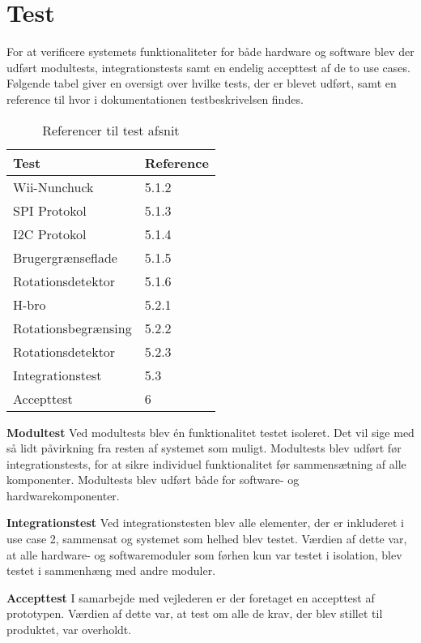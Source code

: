\chapter{Test}
For at verificere systemets funktionaliteter for både hardware og software blev der udført modultests, integrationstests samt en endelig accepttest af de to use cases. Følgende tabel giver en oversigt over hvilke tests, der er blevet udført, samt en reference til hvor i dokumentationen testbeskrivelsen findes.

\begin{table}[H]
	\centering
	\label{test}
	\begin{tabular}{|l|l|}
		\hline
		\textbf{Test}      & \textbf{Reference} \\ \hline
		Wii-Nunchuck        & 5.1.2              \\ \hline
		SPI Protokol        & 5.1.3              \\ \hline
		I2C Protokol        & 5.1.4              \\ \hline
		Brugergrænseflade   & 5.1.5              \\ \hline
		Rotationsdetektor   & 5.1.6              \\ \hline
		H-bro               & 5.2.1              \\ \hline
		Rotationsbegrænsing & 5.2.2              \\ \hline
		Rotationsdetektor   & 5.2.3              \\ \hline
		Integrationstest    & 5.3                \\ \hline
		Accepttest          & 6                  \\ \hline
		
	\end{tabular}
	\caption{Referencer til test afsnit}
\end{table}

\noindent \textbf{Modultest} \newline
\noindent Ved modultests blev én funktionalitet testet isoleret. Det vil sige med så lidt påvirkning fra resten af systemet som muligt. Modultests blev udført før integrationstests, for at sikre individuel funktionalitet før sammensætning af alle komponenter. Modultests blev udført både for software- og hardwarekomponenter. \newline

\noindent \textbf{Integrationstest} \newline
\noindent Ved integrationstesten blev alle elementer, der er inkluderet i use case 2, sammensat og systemet som helhed blev testet. Værdien af dette var, at alle hardware- og softwaremoduler som førhen kun var testet i isolation, blev testet i sammenhæng med andre moduler.  \newline

\noindent \textbf{Accepttest} \newline
\noindent I samarbejde med vejlederen er der foretaget en accepttest af prototypen. Værdien af dette var, at test om alle de krav, der blev stillet til produktet, var overholdt.
